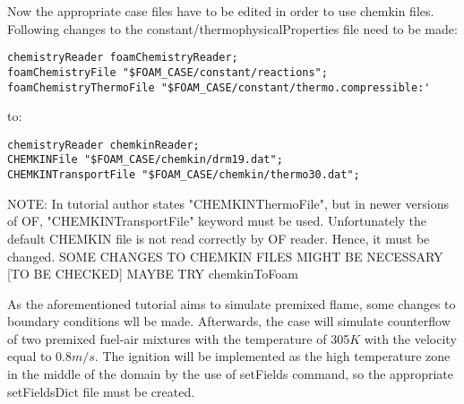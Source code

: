 \documentclass[12pt,english]{article}
\begin{document}
Now the appropriate case files have to be edited in order to use chemkin files. Following changes to the constant/thermophysicalProperties file need to be made:
\begin{lstlisting}
chemistryReader foamChemistryReader;
foamChemistryFile "$FOAM_CASE/constant/reactions";
foamChemistryThermoFile "$FOAM_CASE/constant/thermo.compressible:'
\end{lstlisting}
to:
\begin{lstlisting}
chemistryReader chemkinReader;
CHEMKINFile "$FOAM_CASE/chemkin/drm19.dat";
CHEMKINTransportFile "$FOAM_CASE/chemkin/thermo30.dat";
\end{lstlisting}
NOTE: In tutorial author states "CHEMKINThermoFile", but in newer versions of OF, "CHEMKINTransportFile" keyword must be used.
Unfortunately the default CHEMKIN file is not read correctly by OF reader. Hence, it must be changed.
SOME CHANGES TO CHEMKIN FILES MIGHT BE NECESSARY [TO BE CHECKED]
MAYBE TRY chemkinToFoam

As the aforementioned tutorial aims to simulate premixed flame, some changes to boundary conditions wll be made. Afterwards, the case will simulate counterflow of two premixed fuel-air mixtures with the temperature of 305$K$ with the velocity equal to 0.8$m/s$. The ignition will be implemented as the high temperature zone in the middle of the domain by the use of setFields command, so the appropriate setFieldsDict file must be created.
\end{document}
